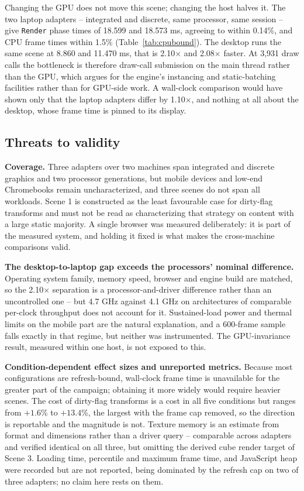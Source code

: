 Changing the GPU does not move this scene; changing the host halves it. The two laptop adapters -- integrated and discrete, same processor, same session -- give \texttt{Render} phase times of 18.599 and 18.573 ms, agreeing to within 0.14\%, and CPU frame times within 1.5\% (Table~\ref{tab:cpubound}). The desktop runs the same scene at 8.860 and 11.470 ms, that is 2.10$\times$ and 2.08$\times$ faster. At 3{,}931 draw calls the bottleneck is therefore draw-call submission on the main thread rather than the GPU, which argues for the engine's instancing and static-batching facilities rather than for GPU-side work. A wall-clock comparison would have shown only that the laptop adapters differ by 1.10$\times$, and nothing at all about the desktop, whose frame time is pinned to its display.

\subsection{Threats to validity}
\label{sec:threats}

\textbf{Coverage.} Three adapters over two machines span integrated and discrete graphics and two processor generations, but mobile devices and low-end Chromebooks remain uncharacterized, and three scenes do not span all workloads. Scene 1 is constructed as the least favourable case for dirty-flag transforms and must not be read as characterizing that strategy on content with a large static majority. A single browser was measured deliberately: it is part of the measured system, and holding it fixed is what makes the cross-machine comparisons valid.

\textbf{The desktop-to-laptop gap exceeds the processors' nominal difference.} Operating system family, memory speed, browser and engine build are matched, so the 2.10$\times$ separation is a processor-and-driver difference rather than an uncontrolled one -- but 4.7 GHz against 4.1 GHz on architectures of comparable per-clock throughput does not account for it. Sustained-load power and thermal limits on the mobile part are the natural explanation, and a 600-frame sample falls exactly in that regime, but neither was instrumented. The GPU-invariance result, measured within one host, is not exposed to this.

\textbf{Condition-dependent effect sizes and unreported metrics.} Because most configurations are refresh-bound, wall-clock frame time is unavailable for the greater part of the campaign; obtaining it more widely would require heavier scenes. The cost of dirty-flag transforms is a cost in all five conditions but ranges from $+1.6$\% to $+13.4$\%, the largest with the frame cap removed, so the direction is reportable and the magnitude is not. Texture memory is an estimate from format and dimensions rather than a driver query -- comparable across adapters and verified identical on all three, but omitting the derived cube render target of Scene 3. Loading time, percentile and maximum frame time, and JavaScript heap were recorded but are not reported, being dominated by the refresh cap on two of three adapters; no claim here rests on them.